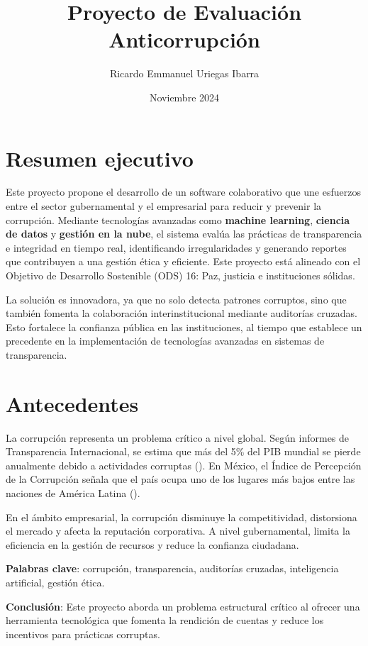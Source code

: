 \documentclass[a4paper,12pt]{article}
\title{Proyecto de Evaluación Anticorrupción}
\author{Ricardo Emmanuel Uriegas Ibarra}
\date{Noviembre 2024}
\begin{document}
\maketitle


\section{Resumen ejecutivo}
Este proyecto propone el desarrollo de un software colaborativo que une esfuerzos entre el sector gubernamental y el empresarial para reducir y prevenir la corrupción. Mediante tecnologías avanzadas como \textbf{machine learning}, \textbf{ciencia de datos} y \textbf{gestión en la nube}, el sistema evalúa las prácticas de transparencia e integridad en tiempo real, identificando irregularidades y generando reportes que contribuyen a una gestión ética y eficiente. Este proyecto está alineado con el Objetivo de Desarrollo Sostenible (ODS) 16: Paz, justicia e instituciones sólidas.

La solución es innovadora, ya que no solo detecta patrones corruptos, sino que también fomenta la colaboración interinstitucional mediante auditorías cruzadas. Esto fortalece la confianza pública en las instituciones, al tiempo que establece un precedente en la implementación de tecnologías avanzadas en sistemas de transparencia.

\section{Antecedentes}
La corrupción representa un problema crítico a nivel global. Según informes de Transparencia Internacional, se estima que más del 5\% del PIB mundial se pierde anualmente debido a actividades corruptas (\cite{transparency2020}). En México, el Índice de Percepción de la Corrupción señala que el país ocupa uno de los lugares más bajos entre las naciones de América Latina (\cite{smith2023}). 

En el ámbito empresarial, la corrupción disminuye la competitividad, distorsiona el mercado y afecta la reputación corporativa. A nivel gubernamental, limita la eficiencia en la gestión de recursos y reduce la confianza ciudadana.

\textbf{Palabras clave}: corrupción, transparencia, auditorías cruzadas, inteligencia artificial, gestión ética.

\textbf{Conclusión}: Este proyecto aborda un problema estructural crítico al ofrecer una herramienta tecnológica que fomenta la rendición de cuentas y reduce los incentivos para prácticas corruptas.
\end{document}
